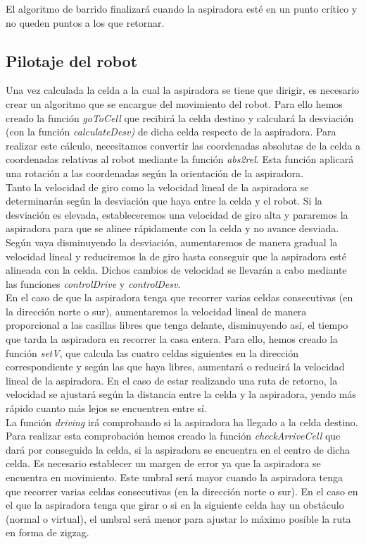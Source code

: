 El algoritmo de barrido finalizará cuando la aspiradora esté en un punto crítico y no queden puntos a los que retornar.


\subsection{Pilotaje del robot}

Una vez calculada la celda a la cual la aspiradora se tiene que dirigir, es necesario crear un algoritmo que se encargue del movimiento del robot. Para ello hemos creado la función \textit{goToCell} que recibirá la celda destino y calculará la desviación (con la función \textit{calculateDesv)} de dicha celda respecto de la aspiradora. Para realizar este cálculo, necesitamos convertir las coordenadas absolutas de la celda a coordenadas relativas al robot mediante la función \textit{abs2rel}. Esta función aplicará una rotación a las coordenadas según la orientación de la aspiradora.\\

Tanto la velocidad de giro como la velocidad lineal de la aspiradora se determinarán según la desviación que haya entre la celda y el robot. Si la desviación es elevada, estableceremos una velocidad de giro alta y pararemos la aspiradora para que se alinee rápidamente con la celda y no avance desviada. Según vaya disminuyendo la desviación, aumentaremos de manera gradual la velocidad lineal y reduciremos la de giro hasta conseguir que la aspiradora esté alineada con la celda. Dichos cambios de velocidad se llevarán a cabo mediante las funciones \textit{controlDrive} y \textit{controlDesv}. \\


En el caso de que la aspiradora tenga que recorrer varias celdas consecutivas (en la dirección norte o sur), aumentaremos la velocidad lineal de manera proporcional a las casillas libres que tenga delante, disminuyendo así, el tiempo que tarda la aspiradora en recorrer la casa entera. Para ello, hemos creado la función \textit{setV}, que calcula las cuatro celdas siguientes en la dirección correspondiente y según las que haya libres, aumentará o reducirá la velocidad lineal de la aspiradora. En el caso de estar realizando una ruta de retorno, la velocidad se ajustará según la distancia entre la celda y la aspiradora, yendo más rápido cuanto más lejos se encuentren entre sí.\\

La función \textit{driving} irá comprobando si la aspiradora ha llegado a la celda destino. Para realizar esta comprobación hemos creado la función \textit{checkArriveCell} que dará por conseguida la celda, si la aspiradora se encuentra en el centro de dicha celda. Es necesario establecer un margen de error ya que la aspiradora se encuentra en movimiento. Este umbral será mayor cuando la aspiradora tenga que recorrer varias celdas consecutivas (en la dirección norte o sur). En el caso en el que la aspiradora tenga que girar o si en la siguiente celda hay un obstáculo (normal o virtual), el umbral será menor para ajustar lo máximo posible la ruta en forma de zigzag. 



